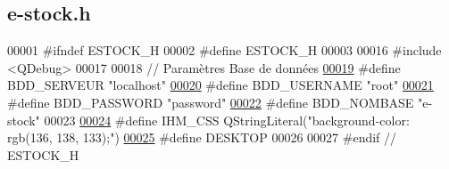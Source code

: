 \hypertarget{e-stock_8h_source}{}\subsection{e-\/stock.h}
\label{e-stock_8h_source}

\begin{DoxyCode}
00001 \textcolor{preprocessor}{#ifndef ESTOCK\_H}
00002 \textcolor{preprocessor}{#define ESTOCK\_H}
00003 
00016 \textcolor{preprocessor}{#include <QDebug>}
00017 
00018 \textcolor{comment}{// Paramètres Base de données}
\hyperlink{e-stock_8h_a423559dc987673b8aacaa9f369839bb0}{00019} \textcolor{preprocessor}{#define BDD\_SERVEUR     "localhost"}
\hyperlink{e-stock_8h_a88b5f5b81fa534553c68802384beff2c}{00020} \textcolor{preprocessor}{#define BDD\_USERNAME    "root"}
\hyperlink{e-stock_8h_ae2ded9166ed2553182545e97514c04f7}{00021} \textcolor{preprocessor}{#define BDD\_PASSWORD    "password"}
\hyperlink{e-stock_8h_a45f8f15b8f9a7ab4c2b219038ff64f6b}{00022} \textcolor{preprocessor}{#define BDD\_NOMBASE     "e-stock"}
00023 
\hyperlink{e-stock_8h_a7185157bd11830373a0f95d0dc88b2c3}{00024} \textcolor{preprocessor}{#define IHM\_CSS         QStringLiteral("background-color: rgb(136, 138, 133);")}
\hyperlink{e-stock_8h_a297b39d16b985a2a55c8c9e47ea5125e}{00025} \textcolor{preprocessor}{#define DESKTOP}
00026 
00027 \textcolor{preprocessor}{#endif // ESTOCK\_H}
\end{DoxyCode}
